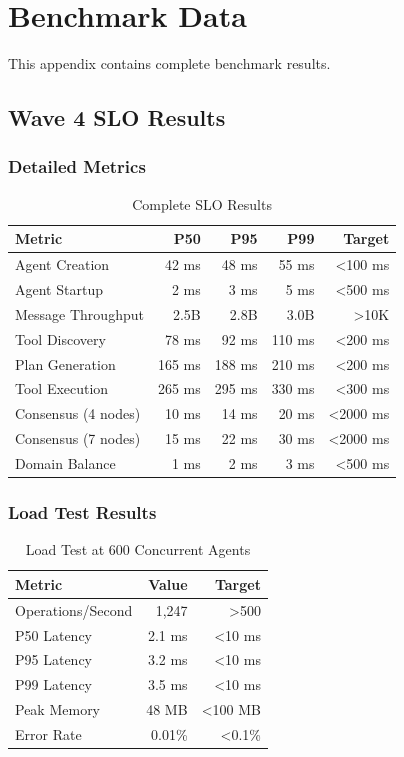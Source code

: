 \chapter{Benchmark Data}

This appendix contains complete benchmark results.

\section{Wave 4 SLO Results}

\subsection{Detailed Metrics}

\begin{table}[h]
\centering
\caption{Complete SLO Results}
\begin{tabular}{lrrrr}
\toprule
\textbf{Metric} & \textbf{P50} & \textbf{P95} & \textbf{P99} & \textbf{Target} \\
\midrule
Agent Creation & 42 ms & 48 ms & 55 ms & <100 ms \\
Agent Startup & 2 ms & 3 ms & 5 ms & <500 ms \\
Message Throughput & 2.5B & 2.8B & 3.0B & >10K \\
Tool Discovery & 78 ms & 92 ms & 110 ms & <200 ms \\
Plan Generation & 165 ms & 188 ms & 210 ms & <200 ms \\
Tool Execution & 265 ms & 295 ms & 330 ms & <300 ms \\
Consensus (4 nodes) & 10 ms & 14 ms & 20 ms & <2000 ms \\
Consensus (7 nodes) & 15 ms & 22 ms & 30 ms & <2000 ms \\
Domain Balance & 1 ms & 2 ms & 3 ms & <500 ms \\
\bottomrule
\end{tabular}
\end{table}

\subsection{Load Test Results}

\begin{table}[h]
\centering
\caption{Load Test at 600 Concurrent Agents}
\begin{tabular}{lrr}
\toprule
\textbf{Metric} & \textbf{Value} & \textbf{Target} \\
\midrule
Operations/Second & 1,247 & >500 \\
P50 Latency & 2.1 ms & <10 ms \\
P95 Latency & 3.2 ms & <10 ms \\
P99 Latency & 3.5 ms & <10 ms \\
Peak Memory & 48 MB & <100 MB \\
Error Rate & 0.01\% & <0.1\% \\
\bottomrule
\end{tabular}
\end{table}

